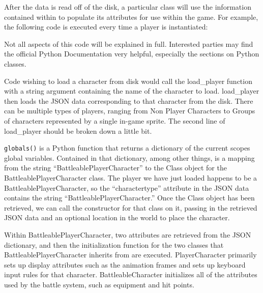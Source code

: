 \documentclass[11pt]{article}
\begin{document}
After the data is read off of the disk, a particular class will use the information contained within to populate its attributes for use within the game.  For example, the following code is executed every time a player is instantiated:

\singlespacing
{}
\doublespacing

Not all aspects of this code will be explained in full.  Interested parties may find the official Python Documentation \cite{PyDocs} very helpful, especially the sections on Python classes.

Code wishing to load a character from disk would call the load\_player function with a string argument containing the name of the character to load.  load\_player then loads the JSON data corresponding to that character from the disk.  There can be multiple types of players, ranging from Non Player Characters to Groups of characters represented by a single in-game sprite.  The second line of load\_player should be broken down a little bit.  

\texttt{globals()} is a Python function that returns a dictionary of the current scopes global variables. Contained in that dictionary, among other things, is a mapping from the string ``BattleablePlayerCharacter'' to the Class object for the BattleablePlayerCharacter class.  The player we have just loaded happens to be a BattleablePlayerCharacter, so the ``charactertype'' attribute in the JSON data contains the string ``BattleablePlayerCharacter.'' Once the Class object has been retrieved, we can call the constructor for that class on it, passing in the retrieved JSON data and an optional location in the world to place the character. 

Within BattleablePlayerCharacter, two attributes are retrieved from the JSON dictionary, and then the initialization function for the two classes that BattleablePlayerCharacter inherits from are executed.  PlayerCharacter primarily sets up display attributes such as the animation frames and sets up keyboard input rules for that character.  BattleableCharacter initializes all of the attributes used by the battle system, such as equipment and hit points.
\end{document}
